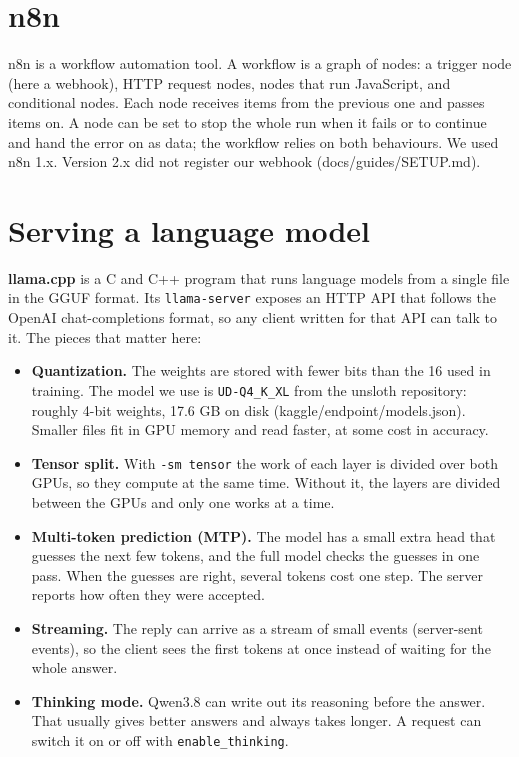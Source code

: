 \documentclass[11pt,a4paper]{report}
\begin{document}
\section{n8n}

n8n is a workflow automation tool. A workflow is a graph of nodes: a trigger node (here a webhook), HTTP request nodes, nodes that run JavaScript, and conditional nodes. Each node receives items from the previous one and passes items on. A node can be set to stop the whole run when it fails or to continue and hand the error on as data; the workflow relies on both behaviours. We used n8n 1.x. Version 2.x did not register our webhook (docs/guides/SETUP.md).

\section{Serving a language model}

\textbf{llama.cpp} is a C and C++ program that runs language models from a single file in the GGUF format. Its \texttt{llama-\allowbreak{}server} exposes an HTTP API that follows the OpenAI chat-completions format, so any client written for that API can talk to it. The pieces that matter here:

\begin{itemize}[leftmargin=*,itemsep=2pt]
\item \textbf{Quantization.} The weights are stored with fewer bits than the 16 used in training. The model we use is \texttt{UD-\allowbreak{}Q4\_\allowbreak{}K\_\allowbreak{}XL} from the unsloth repository: roughly 4-bit weights, 17.6 GB on disk (kaggle/endpoint/models.json). Smaller files fit in GPU memory and read faster, at some cost in accuracy.
\item \textbf{Tensor split.} With \texttt{-\allowbreak{}sm tensor} the work of each layer is divided over both GPUs, so they compute at the same time. Without it, the layers are divided between the GPUs and only one works at a time.
\item \textbf{Multi-token prediction (MTP).} The model has a small extra head that guesses the next few tokens, and the full model checks the guesses in one pass. When the guesses are right, several tokens cost one step. The server reports how often they were accepted.
\item \textbf{Streaming.} The reply can arrive as a stream of small events (server-sent events), so the client sees the first tokens at once instead of waiting for the whole answer.
\item \textbf{Thinking mode.} Qwen3.8 can write out its reasoning before the answer. That usually gives better answers and always takes longer. A request can switch it on or off with \texttt{enable\_\allowbreak{}thinking}.
\end{itemize}
\end{document}
